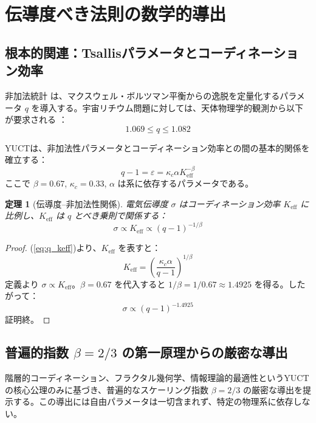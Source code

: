 \documentclass[11pt,a4paper]{article}
\newcommand{\Ke}{K_{\mathrm{eff}}}
\newcommand{\kappac}{\kappa_c}
\newcommand{\alp}{\alpha}
\newtheorem{theorem}{定理}[section]
\theoremstyle{remark}
\begin{document}
	\section{伝導度べき法則の数学的導出}
	
	\subsection{根本的関連：Tsallisパラメータとコーディネーション効率}
	
	非加法統計 \cite{tsallis1988} は、マクスウェル・ボルツマン平衡からの逸脱を定量化するパラメータ \(q\) を導入する。宇宙リチウム問題に対しては、天体物理学的観測から以下が要求される \cite{bertulani2015}：
	\begin{equation}
		1.069 \le q \le 1.082
		\label{eq:q_range}
	\end{equation}
	
	YUCTは、非加法性パラメータとコーディネーション効率との間の基本的関係を確立する：
	\begin{equation}
		q - 1 = \varepsilon = \kappac \alp \Ke^{-\beta}
		\label{eq:q_keff}
	\end{equation}
	ここで \(\beta = 0.67\), \(\kappac = 0.33\), \(\alp\) は系に依存するパラメータである。
	
	\begin{theorem}[伝導度–非加法性関係]
		電気伝導度 \(\sigma\) はコーディネーション効率 \(\Ke\) に比例し、\(\Ke\) は \(q\) とべき乗則で関係する：
		\begin{equation}
			\sigma \propto \Ke \propto (q-1)^{-1/\beta}
			\label{eq:sigma_q}
		\end{equation}
		\label{th:conductivity}
	\end{theorem}
	
	\begin{proof}
		(\ref{eq:q_keff})より、\(\Ke\) を表すと：
		\[
		\Ke = \left( \frac{\kappac \alp}{q-1} \right)^{1/\beta}
		\]
		定義より \(\sigma \propto \Ke\)。\(\beta = 0.67\) を代入すると \(1/\beta = 1/0.67 \approx 1.4925\) を得る。したがって：
		\[
		\sigma \propto (q-1)^{-1.4925}
		\]
		証明終。
	\end{proof}
	
	\subsection{普遍的指数 \(\beta = 2/3\) の第一原理からの厳密な導出}
	\label{subsec:beta_derivation}
	
	階層的コーディネーション、フラクタル幾何学、情報理論的最適性というYUCTの核心公理のみに基づき、普遍的なスケーリング指数 \(\beta = 2/3\) の厳密な導出を提示する。この導出には自由パラメータは一切含まれず、特定の物理系に依存しない。
	
\end{document}
